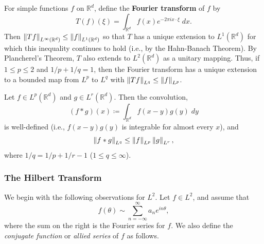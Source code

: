 \documentclass{article}
\begin{document}
\begin{corollary}
	For simple functions $f$ on $\mathbb{R}^{d}$, define the \textbf{Fourier transform} of $f$ by 
	\begin{equation*}
		T(f)(\xi)= \int_{\mathbb{R}^{d}}f(x)e^{-2\pi i x \cdot \xi}\;dx. 
	\end{equation*} 
	Then $\left\Vert Tf \right\Vert_{L^{\infty}(\mathbb{R}^{d})} \leq \left\Vert f \right\Vert_{L^{1}(\mathbb{R}^{d})}$ so that $T$ has a unique extension to $L^{1}(\mathbb{R}^{d})$ for which this inequality continues to hold (i.e., by the Hahn-Banach Theorem). By Plancherel's Theorem, $T$ also extends to $L^{2}(\mathbb{R}^{d})$ as a unitary mapping. Thus, if $1 \leq p \leq 2$ and $1/p + 1/q = 1$, then the Fourier transform has a unique extension to a bounded map from $L^{p}$ to $L^{q}$ with $\left\Vert Tf \right\Vert_{L^{q}} \leq \left\Vert f \right\Vert_{L^{p}}$. 
\end{corollary}

\begin{corollary}
	Let $f \in L^{p}(\mathbb{R}^{d})$ and $g \in L^{r}(\mathbb{R}^{d})$. Then the convolution, 
	\begin{equation*}
		(f \ast g)(x) \coloneqq \int_{\mathbb{R}^{d}}f(x - y)g(y)\;dy
	\end{equation*} 
	is well-defined (i.e., $f(x - y)g(y)$ is integrable for almost every $x$), and 
	\begin{equation*}
		\left\Vert f \ast g \right\Vert_{L^{q}} \leq \left\Vert f \right\Vert_{L^{p}}\left\Vert g \right\Vert_{L^{r}}, 
	\end{equation*} 
	where $1/q = 1/p + 1/r - 1$ ($1 \leq q \leq \infty$). 
\end{corollary} 


\subsubsection{The Hilbert Transform} 

We begin with the following observations for $L^{2}$. Let $f \in L^{2}$, and assume that
\begin{equation*}
	f(\theta) \sim \sum_{n = -\infty}^{\infty}a_{n}e^{in\theta}, 
\end{equation*} 
where the sum on the right is the Fourier series for $f$. We also define the \textit{conjugate function} or \textit{allied series} of $f$ as follows.
\end{document}
